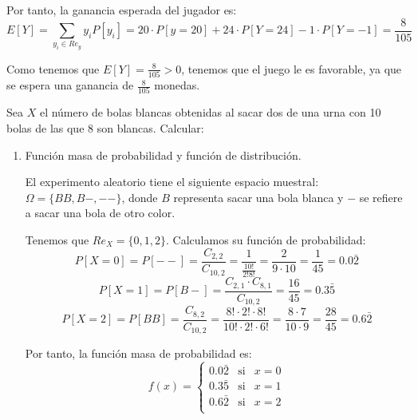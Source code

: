 \begin{ejercicio}
\begin{enumerate}
        Por tanto, la ganancia esperada del jugador es:
        \begin{equation*}
            E[Y]=\sum_{y_i\in Re_y} y_iP[y_i]
            = 20\cdot P[y=20] + 24\cdot P[Y=24] -1\cdot P[Y=-1] = \frac{8}{105}
        \end{equation*}

        Como tenemos que $E[Y]= \frac{8}{105} >0$, tenemos que el juego le es favorable, ya que se espera una ganancia de $\frac{8}{105}$ monedas.
    \end{enumerate}
\end{ejercicio}

\begin{ejercicio}
    Sea $X$ el número de bolas blancas obtenidas al sacar dos de una urna con 10 bolas de las que 8 son blancas. Calcular:
    \begin{enumerate}
        \item Función masa de probabilidad y función de distribución.

        El experimento aleatorio tiene el siguiente espacio muestral: $\Omega = \{BB, B-, --\}$, donde $B$ representa sacar una bola blanca y $-$ se refiere a sacar una bola de otro color.
        
        Tenemos que $Re_X = \{0,1,2\}$. Calculamos su función de probabilidad:
        \begin{equation*}
            P[X=0] = P[--] = \frac{C_{2,2}}{C_{10,2}} = \frac{1}{\frac{10!}{2!8!}} = \frac{2}{9\cdot 10} = \frac{1}{45} = 0.0\bar{2}
        \end{equation*}
        \begin{equation*}
            P[X=1] = P[B-] = \frac{C_{2,1}\cdot C_{8,1}}{C_{10,2}} = \frac{16}{45} = 0.3\bar{5}
        \end{equation*}
        \begin{equation*}
            P[X=2] = P[BB] = \frac{C_{8,2}}{C_{10,2}} = \frac{8! \cdot 2! \cdot 8!}{10!\cdot 2! \cdot 6!} = \frac{8\cdot 7}{10\cdot 9} = \frac{28}{45} = 0.6\bar{2}
        \end{equation*}

        Por tanto, la función masa de probabilidad es:
        \begin{equation*}
            f(x) = \left\{\begin{array}{ccc}
                0.0\bar{2} & \text{si} & x=0 \\
                0.3\bar{5} & \text{si} & x=1 \\
                0.6\bar{2} & \text{si} & x=2 \\
            \end{array}\right.    
        \end{equation*}


\end{enumerate}
\end{ejercicio}
